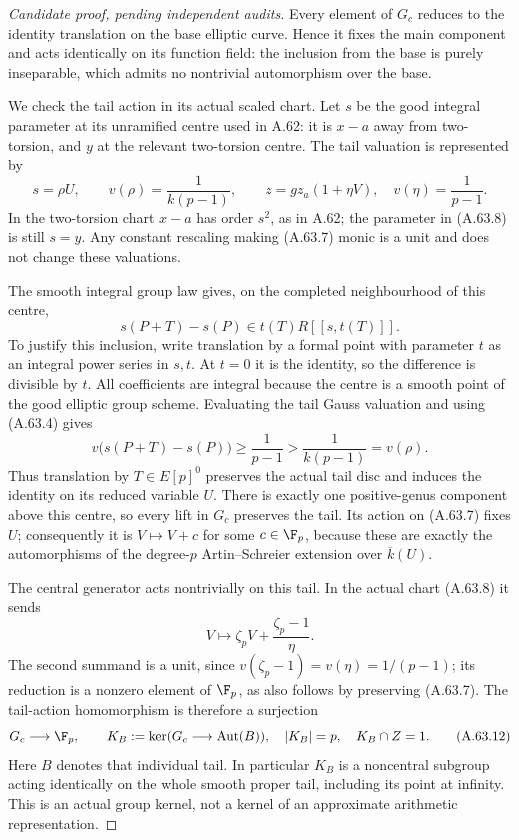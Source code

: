 \begin{proof}[Candidate proof, pending independent audits]
Every element of \(G_c\) reduces to the identity translation
on the base elliptic curve. Hence it fixes the main component
and acts identically on its function field: the inclusion
from the base is purely inseparable, which admits no
nontrivial automorphism over the base.

We check the tail action in its actual scaled chart. Let
\(s\) be the good integral parameter at its unramified
centre used in A.62: it is \(x-a\) away from two-torsion,
and \(y\) at the relevant two-torsion centre. The tail
valuation is represented by
\[
 s=\rho U,\qquad
 v(\rho)=\frac1{k(p-1)},\qquad
 z=g z_a(1+\eta V),\quad v(\eta)=\frac1{p-1}.
                                                        \tag{A.63.8}
\]
In the two-torsion chart \(x-a\) has order \(s^2\), as
in A.62; the parameter in (A.63.8) is still \(s=y\).
Any constant rescaling making (A.63.7) monic is a unit and
does not change these valuations.

The smooth integral group law gives, on the completed
neighbourhood of this centre,
\[
                 s(P+T)-s(P)\in t(T)R[[s,t(T)]].        \tag{A.63.9}
\]
To justify this inclusion, write translation by a formal
point with parameter \(t\) as an integral power series
in \(s,t\). At \(t=0\) it is the identity, so the
difference is divisible by \(t\). All coefficients are
integral because the centre is a smooth point of the good
elliptic group scheme. Evaluating the tail Gauss valuation
and using (A.63.4) gives
\[
 v\bigl(s(P+T)-s(P)\bigr)\ge\frac1{p-1}
           >\frac1{k(p-1)}=v(\rho).                    \tag{A.63.10}
\]
Thus translation by \(T\in E[p]^0\) preserves the actual
tail disc and induces the identity on its reduced variable
\(U\). There is exactly one positive-genus component
above this centre, so every lift in \(G_c\) preserves the
tail. Its action on (A.63.7) fixes \(U\); consequently it
is \(V\mapsto V+c\) for some \(c\in\F_p\), because
these are exactly the automorphisms of the degree-\(p\)
Artin--Schreier extension over \(\overline k(U)\).

The central generator acts nontrivially on this tail. In
the actual chart (A.63.8) it sends
\[
       V\longmapsto\zeta_pV+\frac{\zeta_p-1}{\eta}.
                                                        \tag{A.63.11}
\]
The second summand is a unit, since
\(v(\zeta_p-1)=v(\eta)=1/(p-1)\); its reduction is a
nonzero element of \(\F_p\), as also follows by
preserving (A.63.7). The tail-action homomorphism is
therefore a surjection
\[
 G_c\longrightarrow\F_p,\qquad
 K_B:=\ker(G_c\longrightarrow\operatorname{Aut}(B)),
 \quad |K_B|=p,\quad K_B\cap Z=1.                       \tag{A.63.12}
\]
Here \(B\) denotes that individual tail. In particular
\(K_B\) is a noncentral subgroup acting identically on
the whole smooth proper tail, including its point at
infinity. This is an actual group kernel, not a kernel of
an approximate arithmetic representation.


\end{proof}
